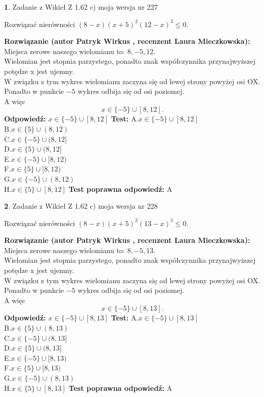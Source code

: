 \documentclass[12pt, a4paper]{article}
\theoremstyle{definition} %
\newtheorem{zad}{}
\newcommand{\zadStart}[1]{\begin{zad}#1\newline}
\newcommand{\zadStop}{\end{zad}}
\newcommand{\rozwStart}[2]{\noindent \textbf{Rozwiązanie (autor #1 , recenzent #2): }\newline}
\newcommand{\rozwStop}{\newline}
\newcommand{\odpStart}{\noindent \textbf{Odpowiedź:}\newline}
\newcommand{\odpStop}{\newline}
\newcommand{\testStart}{\noindent \textbf{Test:}\newline}
\newcommand{\testStop}{\newline}
\newcommand{\kluczStart}{\noindent \textbf{Test poprawna odpowiedź:}\newline}
\newcommand{\kluczStop}{\newline}
\begin{document}
\zadStart{Zadanie z Wikieł Z 1.62 c) moja wersja nr 227}

Rozwiązać nierówności $(8-x)(x+5)^{2}(12-x)^{3}\le0$.
\zadStop
\rozwStart{Patryk Wirkus}{Laura Mieczkowska}
Miejsca zerowe naszego wielomianu to: $8, -5, 12$.\\
Wielomian jest stopnia parzystego, ponadto znak współczynnika przy\linebreak najwyższej potędze x jest ujemny.\\ W związku z tym wykres wielomianu zaczyna się od lewej strony powyżej osi OX.\\
Ponadto w punkcie $-5$ wykres odbija się od osi poziomej.\\
A więc $$x \in \{-5\} \cup [8,12].$$
\rozwStop
\odpStart
$x \in \{-5\} \cup [8,12]$
\odpStop
\testStart
A.$x \in \{-5\} \cup [8,12]$\\
B.$x \in \{5\} \cup (8,12)$\\
C.$x \in \{-5\} \cup (8,12]$\\
D.$x \in \{5\} \cup (8,12]$\\
E.$x \in \{-5\} \cup [8,12)$\\
F.$x \in \{5\} \cup [8,12)$\\
G.$x \in \{-5\} \cup (8,12)$\\
H.$x \in \{5\} \cup [8,12]$
\testStop
\kluczStart
A
\kluczStop



\zadStart{Zadanie z Wikieł Z 1.62 c) moja wersja nr 228}

Rozwiązać nierówności $(8-x)(x+5)^{2}(13-x)^{3}\le0$.
\zadStop
\rozwStart{Patryk Wirkus}{Laura Mieczkowska}
Miejsca zerowe naszego wielomianu to: $8, -5, 13$.\\
Wielomian jest stopnia parzystego, ponadto znak współczynnika przy\linebreak najwyższej potędze x jest ujemny.\\ W związku z tym wykres wielomianu zaczyna się od lewej strony powyżej osi OX.\\
Ponadto w punkcie $-5$ wykres odbija się od osi poziomej.\\
A więc $$x \in \{-5\} \cup [8,13].$$
\rozwStop
\odpStart
$x \in \{-5\} \cup [8,13]$
\odpStop
\testStart
A.$x \in \{-5\} \cup [8,13]$\\
B.$x \in \{5\} \cup (8,13)$\\
C.$x \in \{-5\} \cup (8,13]$\\
D.$x \in \{5\} \cup (8,13]$\\
E.$x \in \{-5\} \cup [8,13)$\\
F.$x \in \{5\} \cup [8,13)$\\
G.$x \in \{-5\} \cup (8,13)$\\
H.$x \in \{5\} \cup [8,13]$
\testStop
\kluczStart
A
\kluczStop
\end{document}
